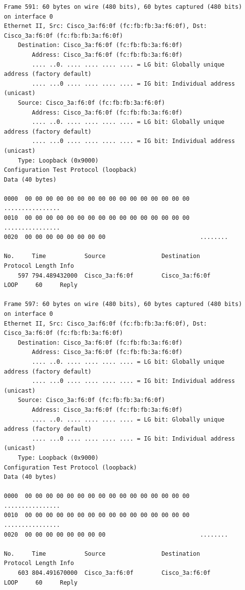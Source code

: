 \documentclass[a4paper,11pt]{article}
\begin{document}
\begin{lstlisting}
Frame 591: 60 bytes on wire (480 bits), 60 bytes captured (480 bits) on interface 0
Ethernet II, Src: Cisco_3a:f6:0f (fc:fb:fb:3a:f6:0f), Dst: Cisco_3a:f6:0f (fc:fb:fb:3a:f6:0f)
    Destination: Cisco_3a:f6:0f (fc:fb:fb:3a:f6:0f)
        Address: Cisco_3a:f6:0f (fc:fb:fb:3a:f6:0f)
        .... ..0. .... .... .... .... = LG bit: Globally unique address (factory default)
        .... ...0 .... .... .... .... = IG bit: Individual address (unicast)
    Source: Cisco_3a:f6:0f (fc:fb:fb:3a:f6:0f)
        Address: Cisco_3a:f6:0f (fc:fb:fb:3a:f6:0f)
        .... ..0. .... .... .... .... = LG bit: Globally unique address (factory default)
        .... ...0 .... .... .... .... = IG bit: Individual address (unicast)
    Type: Loopback (0x9000)
Configuration Test Protocol (loopback)
Data (40 bytes)

0000  00 00 00 00 00 00 00 00 00 00 00 00 00 00 00 00   ................
0010  00 00 00 00 00 00 00 00 00 00 00 00 00 00 00 00   ................
0020  00 00 00 00 00 00 00 00                           ........

No.     Time           Source                Destination           Protocol Length Info
    597 794.489432000  Cisco_3a:f6:0f        Cisco_3a:f6:0f        LOOP     60     Reply

Frame 597: 60 bytes on wire (480 bits), 60 bytes captured (480 bits) on interface 0
Ethernet II, Src: Cisco_3a:f6:0f (fc:fb:fb:3a:f6:0f), Dst: Cisco_3a:f6:0f (fc:fb:fb:3a:f6:0f)
    Destination: Cisco_3a:f6:0f (fc:fb:fb:3a:f6:0f)
        Address: Cisco_3a:f6:0f (fc:fb:fb:3a:f6:0f)
        .... ..0. .... .... .... .... = LG bit: Globally unique address (factory default)
        .... ...0 .... .... .... .... = IG bit: Individual address (unicast)
    Source: Cisco_3a:f6:0f (fc:fb:fb:3a:f6:0f)
        Address: Cisco_3a:f6:0f (fc:fb:fb:3a:f6:0f)
        .... ..0. .... .... .... .... = LG bit: Globally unique address (factory default)
        .... ...0 .... .... .... .... = IG bit: Individual address (unicast)
    Type: Loopback (0x9000)
Configuration Test Protocol (loopback)
Data (40 bytes)

0000  00 00 00 00 00 00 00 00 00 00 00 00 00 00 00 00   ................
0010  00 00 00 00 00 00 00 00 00 00 00 00 00 00 00 00   ................
0020  00 00 00 00 00 00 00 00                           ........

No.     Time           Source                Destination           Protocol Length Info
    603 804.491670000  Cisco_3a:f6:0f        Cisco_3a:f6:0f        LOOP     60     Reply


\end{lstlisting}
\end{document}
